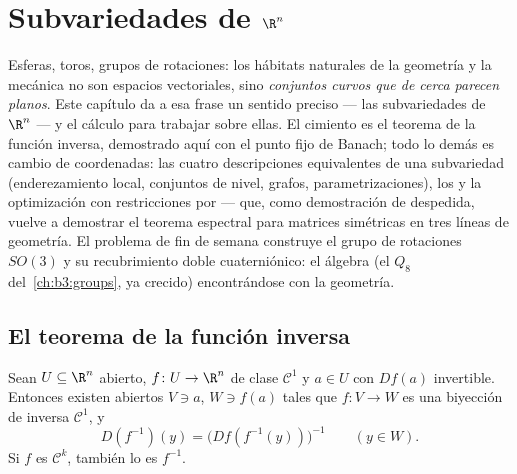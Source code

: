 \chapter{Subvariedades de \texorpdfstring{$\R^n$}{Rn}}
\label{ch:b3:submanifolds}

Esferas, toros, grupos de rotaciones: los hábitats naturales de la
geometría y la mecánica no son espacios vectoriales, sino
\emph{conjuntos curvos que de cerca parecen planos}. Este capítulo da a
esa frase un sentido preciso --- las subvariedades de $\R^n$ --- y el
cálculo para trabajar sobre ellas. El cimiento es el teorema de la
función inversa, demostrado aquí con el punto fijo de Banach; todo lo
demás es cambio de coordenadas: las cuatro descripciones equivalentes de
una subvariedad (enderezamiento local, conjuntos de nivel, grafos,
parametrizaciones), los  y la optimización con restricciones por
 ---
que, como demostración de despedida, vuelve a demostrar el teorema
espectral para matrices simétricas en tres líneas de geometría. El
problema de fin de semana construye el grupo de rotaciones $SO(3)$ y su
recubrimiento doble cuaterniónico: el álgebra (el $Q_8$
del~\cref{ch:b3:groups}, ya crecido) encontrándose con la geometría.

\section{El teorema de la función inversa}

\begin{theorem}
\label{thm:b3:submanifolds:ift}
Sean $U \subseteq \R^n$ abierto, $f \colon U \to \R^n$ de clase
$\mathcal C^1$ y $a \in U$ con $Df(a)$ invertible. Entonces existen
abiertos $V \ni a$, $W \ni f(a)$
tales que $f \colon V \to W$ es una biyección de inversa $\mathcal C^1$,
y
\[
D(f^{-1})(y) = \bigl(Df(f^{-1}(y))\bigr)^{-1}
\qquad (y \in W).
\]
Si $f$ es $\mathcal C^k$, también lo es $f^{-1}$.
\end{theorem}

